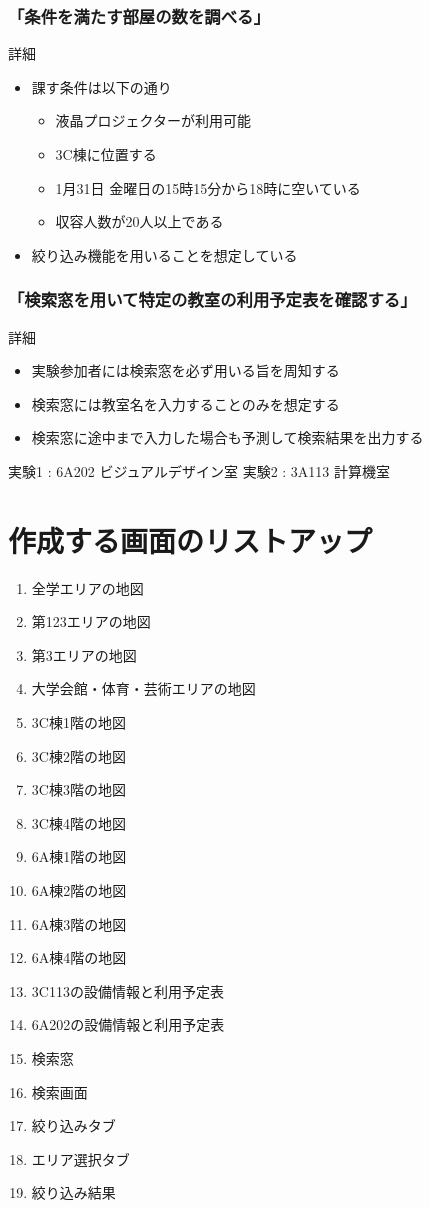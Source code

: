 \documentclass[12pt,a4paper,dvipdf]{jsarticle}
\begin{document}
\subsubsection{「条件を満たす部屋の数を調べる」}
詳細
\begin{itemize}
    \item 課す条件は以下の通り
          \begin{itemize}
              \item 液晶プロジェクターが利用可能
              \item 3C棟に位置する
              \item 1月31日 金曜日の15時15分から18時に空いている
              \item 収容人数が20人以上である
          \end{itemize}
    \item 絞り込み機能を用いることを想定している
\end{itemize}

\subsubsection{「検索窓を用いて特定の教室の利用予定表を確認する」}
詳細
\begin{itemize}
    \item 実験参加者には検索窓を必ず用いる旨を周知する
    \item 検索窓には教室名を入力することのみを想定する
    \item 検索窓に途中まで入力した場合も予測して検索結果を出力する
\end{itemize}
実験1 : 6A202 ビジュアルデザイン室
実験2 : 3A113 計算機室


\section{作成する画面のリストアップ}
\begin{enumerate}
    \item 全学エリアの地図
    \item 第123エリアの地図
    \item 第3エリアの地図
    \item 大学会館・体育・芸術エリアの地図
    \item 3C棟1階の地図
    \item 3C棟2階の地図
    \item 3C棟3階の地図
    \item 3C棟4階の地図
    \item 6A棟1階の地図
    \item 6A棟2階の地図
    \item 6A棟3階の地図
    \item 6A棟4階の地図
    \item 3C113の設備情報と利用予定表
    \item 6A202の設備情報と利用予定表
    \item 検索窓
    \item 検索画面
    \item 絞り込みタブ
    \item エリア選択タブ
    \item 絞り込み結果
\end{enumerate}
\end{document}
